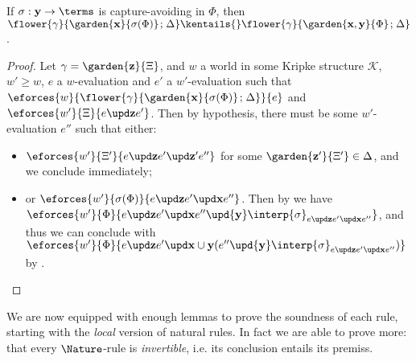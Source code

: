 \begin{lemma}
  
  If $\sigma : \by \to \terms$ is capture-avoiding in $\Phi$, then
  $\flower{\gamma}{\garden{\bx}{\sigma(\Phi)} \sep \Delta} \kentails{}
  \flower{\gamma}{\garden{\bx,\by}{\Phi} \sep \Delta}$.
\end{lemma}
\begin{proof}
  Let $\gamma = \garden{\bz}{\Xi}$, and $w$ a world in some Kripke
  structure $\mathcal{K}$, $w' \geq w$, $e$ a $w$-evaluation and $e'$ a
  $w'$-evaluation such that
  $\eforces{w}{\flower{\gamma}{\garden{\bx}{\sigma(\Phi)} \sep \Delta}}{e}$ and
  $\eforces{w'}{\Xi}{\update{e}{\bz}{e'}}$. Then by hypothesis, there must be
  some $w'$-evaluation $e''$ such that either:
  \begin{itemize}
    \item
    $\eforces{w'}{\Xi'}{\update{e}{\bz}{\update{e'}{\bz'}{e''}}}$ for some
    $\garden{\bz'}{\Xi'} \in \Delta$, and we conclude immediately;
    \item
    or $\eforces{w'}{\sigma(\Phi)}{\update{e}{\bz}{\update{e'}{\bx}{e''}}}$.
    Then by  we have
    $\eforces{w'}{\Phi}{\update{e}{\bz}{\update{e'}{\bx}{e'' \upd{\by}
    \interp{\sigma}_{\update{e}{\bz}{\update{e'}{\bx}{e''}}}}}}$, and thus we
    can conclude with $\eforces{w'}{\Phi}{\update{e}{\bz}{\update{e'}{\bx \cup
    \by}{(e'' \upd{\by}
    \interp{\sigma}_{\update{e}{\bz}{\update{e'}{\bx}{e''}}})}}}$ by
    .
  \end{itemize}
\end{proof}

We are now equipped with enough lemmas to prove the soundness of each rule,
starting with the \emph{local} version of natural rules. In fact we are able to
prove more: that every $\Nature$-rule is \emph{invertible}, i.e. its conclusion
entails its premiss.

